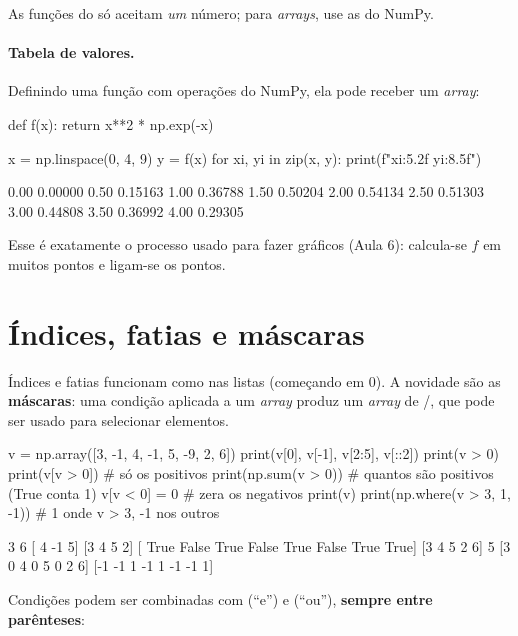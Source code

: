 As funções do  só aceitam \emph{um} número; para \emph{arrays}, use as do NumPy.

\paragraph{Tabela de valores.} Definindo uma função com operações do NumPy, ela pode receber um \emph{array}:

\begin{entrada}
def f(x):
    return x**2 * np.exp(-x)

x = np.linspace(0, 4, 9)
y = f(x)
for xi, yi in zip(x, y):
    print(f"{xi:5.2f}  {yi:8.5f}")
\end{entrada}
\begin{saida}
 0.00   0.00000
 0.50   0.15163
 1.00   0.36788
 1.50   0.50204
 2.00   0.54134
 2.50   0.51303
 3.00   0.44808
 3.50   0.36992
 4.00   0.29305
\end{saida}

Esse é exatamente o processo usado para fazer gráficos (Aula 6): calcula-se $f$ em muitos pontos e
ligam-se os pontos.

\section{Índices, fatias e máscaras}

Índices e fatias funcionam como nas listas (começando em 0). A novidade são as \textbf{máscaras}: uma condição
aplicada a um \emph{array} produz um \emph{array} de /, que pode ser usado para selecionar
elementos.

\begin{entrada}
v = np.array([3, -1, 4, -1, 5, -9, 2, 6])
print(v[0], v[-1], v[2:5], v[::2])
print(v > 0)
print(v[v > 0])                 # só os positivos
print(np.sum(v > 0))            # quantos são positivos (True conta 1)
v[v < 0] = 0                    # zera os negativos
print(v)
print(np.where(v > 3, 1, -1))   # 1 onde v > 3, -1 nos outros
\end{entrada}
\begin{saida}
3 6 [ 4 -1  5] [3 4 5 2]
[ True False  True False  True False  True  True]
[3 4 5 2 6]
5
[3 0 4 0 5 0 2 6]
[-1 -1  1 -1  1 -1 -1  1]
\end{saida}

Condições podem ser combinadas com \py{&} (``e'') e \py{|} (``ou''), \textbf{sempre entre parênteses}:


